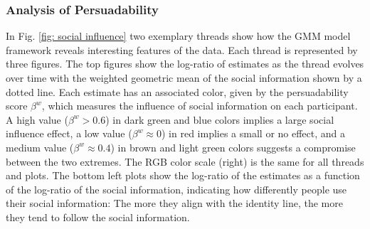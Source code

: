 \documentclass[9pt,a4paper,twocolumn,lineno]{article}
\begin{document}
\subsubsection*{Analysis of Persuadability}

In Fig. \ref{fig: social influence} two exemplary threads show how the GMM model framework reveals interesting features of the data. Each thread is represented by three figures. The top figures show the log-ratio of estimates as the thread evolves over time with the weighted geometric mean of the social information shown by a dotted line. Each estimate has an associated color, given by the persuadability score $\beta^w$, which measures the influence of social information on each participant. A high value ($\beta^w>0.6$) in dark green and blue colors implies a large social influence effect, a low value ($\beta^w\approx 0$) in red implies a small or no effect, and a medium value ($\beta^w \approx 0.4$) in brown and light green colors suggests a compromise between the two extremes. The RGB color scale (right) is the same for all threads and plots. The bottom left plots show the log-ratio of the estimates as a function of the log-ratio of the social information, indicating how differently people use their social information: The more they align with the identity line, the more they tend to follow the social information.
\end{document}

